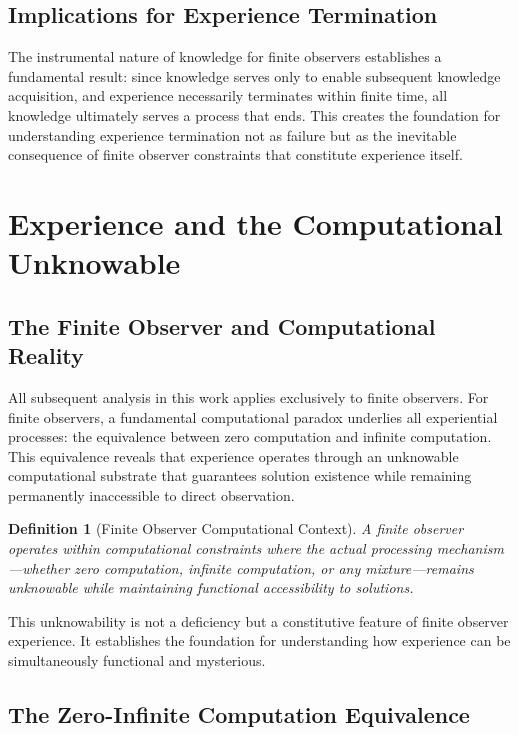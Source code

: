 \documentclass{article}
\newtheorem{definition}[theorem]{Definition}
\begin{document}
\subsection{Implications for Experience Termination}

The instrumental nature of knowledge for finite observers establishes a fundamental result: since knowledge serves only to enable subsequent knowledge acquisition, and experience necessarily terminates within finite time, all knowledge ultimately serves a process that ends. This creates the foundation for understanding experience termination not as failure but as the inevitable consequence of finite observer constraints that constitute experience itself.

\section{Experience and the Computational Unknowable}

\subsection{The Finite Observer and Computational Reality}

All subsequent analysis in this work applies exclusively to finite observers. For finite observers, a fundamental computational paradox underlies all experiential processes: the equivalence between zero computation and infinite computation. This equivalence reveals that experience operates through an unknowable computational substrate that guarantees solution existence while remaining permanently inaccessible to direct observation.

\begin{definition}[Finite Observer Computational Context]
A finite observer operates within computational constraints where the actual processing mechanism—whether zero computation, infinite computation, or any mixture—remains unknowable while maintaining functional accessibility to solutions.
\end{definition}

This unknowability is not a deficiency but a constitutive feature of finite observer experience. It establishes the foundation for understanding how experience can be simultaneously functional and mysterious.

\subsection{The Zero-Infinite Computation Equivalence}
\end{document}
